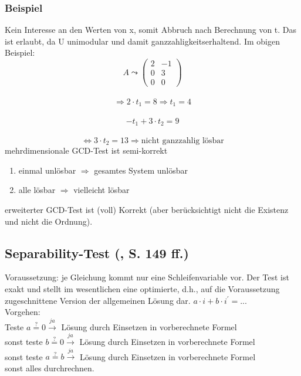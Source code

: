 \subsubsection{Beispiel}
Kein Interesse an den Werten von x, somit Abbruch nach Berechnung von t. Das ist erlaubt, da U unimodular und damit \glqq ganzzahligkeitserhaltend\grqq . 
Im obigen Beispiel:\\
\[ A \leadsto 
\begin{pmatrix}
2 &  -1 \\
0 & 3 \\
0 & 0
\end{pmatrix}
\] \\
\[\Rightarrow 2 \cdot t_1 = 8 \Rightarrow t_1 = 4 \] \\
\[-t_1 + 3 \cdot t_2 = 9 \] \\
\[\Leftrightarrow 3 \cdot t_2 = 13 \Rightarrow \text{nicht ganzzahlig lösbar}
\]
mehrdimensionale GCD-Test ist \glqq semi-korrekt\grqq \\
\begin{enumerate}
  \item einmal unlösbar \( \Rightarrow \) gesamtes System unlösbar
  \item alle lösbar \( \Rightarrow \) vielleicht lösbar
\end{enumerate}
erweiterter GCD-Test ist (voll) Korrekt (aber berücksichtigt nicht die Existenz und nicht die Ordnung).


\subsection{Separability-Test (\cite{Zima90}, S. 149 ff.)}

Voraussetzung: je Gleichung kommt nur eine Schleifenvariable vor.  Der
Test ist exakt und stellt im wesentlichen eine optimierte, d.h., auf die
Voraussetzung zugeschnittene Version der allgemeinen Lösung dar. 
\( a \cdot i + b \cdot i^\prime = \text{...} \) \\
Vorgehen:\\
Teste \(a \stackrel{?}{=} 0 \stackrel{ja}{\rightarrow} \) Lösung durch Einsetzen in vorberechnete Formel\\
sonst teste \(b \stackrel{?}{=} 0 \stackrel{ja}{\rightarrow} \) Lösung durch Einsetzen in vorberechnete Formel\\
sonst teste \(a \stackrel{?}{=} b \stackrel{ja}{\rightarrow} \) Lösung durch Einsetzen in vorberechnete Formel\\
sonst alles durchrechnen.

